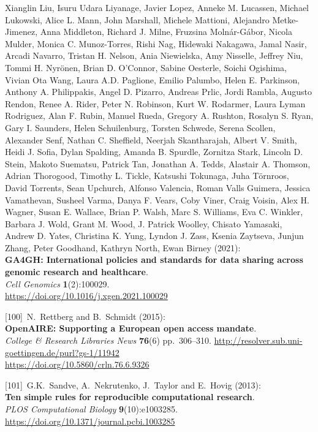 Xianglin Liu, Isuru Udara Liyanage, Javier Lopez, Anneke M. Lucassen,
Michael Lukowski, Alice L. Mann, John Marshall, Michele Mattioni,
Alejandro Metke-Jimenez, Anna Middleton, Richard J. Milne, Fruzsina
Molnár-Gábor, Nicola Mulder, Monica C. Munoz-Torres, Rishi Nag, Hidewaki
Nakagawa, Jamal Nasir, Arcadi Navarro, Tristan H. Nelson, Ania
Niewielska, Amy Nisselle, Jeffrey Niu, Tommi H. Nyrönen, Brian D.
O'Connor, Sabine Oesterle, Soichi Ogishima, Vivian Ota Wang, Laura A.D.
Paglione, Emilio Palumbo, Helen E. Parkinson, Anthony A. Philippakis,
Angel D. Pizarro, Andreas Prlic, Jordi Rambla, Augusto Rendon, Renee A.
Rider, Peter N. Robinson, Kurt W. Rodarmer, Laura Lyman Rodriguez, Alan
F. Rubin, Manuel Rueda, Gregory A. Rushton, Rosalyn S. Ryan, Gary I.
Saunders, Helen Schuilenburg, Torsten Schwede, Serena Scollen, Alexander
Senf, Nathan C. Sheffield, Neerjah Skantharajah, Albert V. Smith, Heidi
J. Sofia, Dylan Spalding, Amanda B. Spurdle, Zornitza Stark, Lincoln D.
Stein, Makoto Suematsu, Patrick Tan, Jonathan A. Tedds, Alastair A.
Thomson, Adrian Thorogood, Timothy L. Tickle, Katsushi Tokunaga, Juha
Törnroos, David Torrents, Sean Upchurch, Alfonso Valencia, Roman Valls
Guimera, Jessica Vamathevan, Susheel Varma, Danya F. Vears, Coby Viner,
Craig Voisin, Alex H. Wagner, Susan E. Wallace, Brian P. Walsh, Marc S.
Williams, Eva C. Winkler, Barbara J. Wold, Grant M. Wood, J. Patrick
Woolley, Chisato Yamasaki, Andrew D. Yates, Christina K. Yung, Lyndon J.
Zass, Ksenia Zaytseva, Junjun Zhang, Peter Goodhand, Kathryn North, Ewan
Birney (2021):\\
\textbf{GA4GH: International policies and standards for data sharing
across genomic research and healthcare}.\\
\emph{Cell Genomics} \textbf{1}(2):100029.\\
\url{https://doi.org/10.1016/j.xgen.2021.100029}

{[}100{]}~N.~Rettberg and B.~Schmidt (2015):\\
\textbf{OpenAIRE: Supporting a European open access mandate}.\\
\emph{College \& Research Libraries News} \textbf{76}(6) pp.~306--310.
\url{http://resolver.sub.uni-goettingen.de/purl?gs-1/11942}\\
\url{https://doi.org/10.5860/crln.76.6.9326}

{[}101{]}~G.K.~Sandve, A.~Nekrutenko, J.~Taylor and E.~Hovig (2013):\\
\textbf{Ten simple rules for reproducible computational research}.\\
\emph{PLOS Computational Biology} \textbf{9}(10):e1003285.\\
\url{https://doi.org/10.1371/journal.pcbi.1003285}

